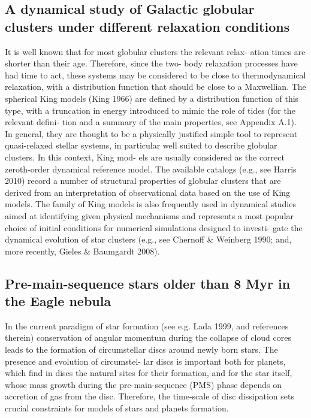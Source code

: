 \documentclass[../Main.tex]{subfiles}
\begin{document}
{\subsection{A dynamical study of Galactic globular clusters
under different relaxation conditions}
It is well known that for most globular clusters the relevant relax-
ation times are shorter than their age. Therefore, since the two-
body relaxation processes have had time to act, these systems
may be considered to be close to thermodynamical relaxation,
with a distribution function that should be close to a Maxwellian.
The spherical King models (King 1966) are defined by a
distribution function of this type, with a truncation in energy
introduced to mimic the role of tides (for the relevant defini-
tion and a summary of the main properties, see Appendix A.1).
In general, they are thought to be a physically justified simple
tool to represent quasi-relaxed stellar systems, in particular well
suited to describe globular clusters. In this context, King mod-
els are usually considered as the correct zeroth-order dynamical
reference model. The available catalogs (e.g., see Harris 2010)
record a number of structural properties of globular clusters that
are derived from an interpretation of observational data based
on the use of King models. The family of King models is also
frequently used in dynamical studies aimed at identifying given
physical mechanisms and represents a most popular choice of
initial conditions for numerical simulations designed to investi-
gate the dynamical evolution of star clusters (e.g., see Chernoﬀ
& Weinberg 1990; and, more recently, Gieles & Baumgardt
2008).
\subsection{Pre-main-sequence stars older than 8 Myr in the Eagle nebula}
In the current paradigm of star formation (see e.g. Lada 1999, and
references therein) conservation of angular momentum during the
collapse of cloud cores leads to the formation of circumstellar discs
around newly born stars. The presence and evolution of circumstel-
lar discs is important both for planets, which find in discs the natural
sites for their formation, and for the star itself, whose mass growth
during the pre-main-sequence (PMS) phase depends on accretion
of gas from the disc. Therefore, the time-scale of disc dissipation
sets crucial constraints for models of stars and planets formation.

}
\end{document}

